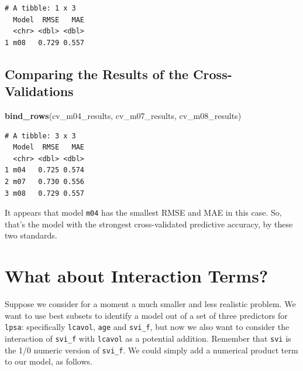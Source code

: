 \documentclass[]{book}
\newenvironment{Shaded}{\begin{snugshade}}{\end{snugshade}}
\newcommand{\KeywordTok}[1]{\textcolor[rgb]{0.13,0.29,0.53}{\textbf{#1}}}
\newcommand{\DataTypeTok}[1]{\textcolor[rgb]{0.13,0.29,0.53}{#1}}
\newcommand{\DecValTok}[1]{\textcolor[rgb]{0.00,0.00,0.81}{#1}}
\newcommand{\StringTok}[1]{\textcolor[rgb]{0.31,0.60,0.02}{#1}}
\newcommand{\OtherTok}[1]{\textcolor[rgb]{0.56,0.35,0.01}{#1}}
\newcommand{\OperatorTok}[1]{\textcolor[rgb]{0.81,0.36,0.00}{\textbf{#1}}}
\newcommand{\NormalTok}[1]{#1}
\theoremstyle{definition}
\theoremstyle{definition}
\theoremstyle{definition}
\theoremstyle{remark}
\begin{document}
\begin{verbatim}
# A tibble: 1 x 3
  Model  RMSE   MAE
  <chr> <dbl> <dbl>
1 m08   0.729 0.557
\end{verbatim}

\subsection{Comparing the Results of the
Cross-Validations}\label{comparing-the-results-of-the-cross-validations}

\begin{Shaded}
\begin{Highlighting}[]
\KeywordTok{bind_rows}\NormalTok{(cv_m04_results, cv_m07_results, cv_m08_results)}
\end{Highlighting}
\end{Shaded}

\begin{verbatim}
# A tibble: 3 x 3
  Model  RMSE   MAE
  <chr> <dbl> <dbl>
1 m04   0.725 0.574
2 m07   0.730 0.556
3 m08   0.729 0.557
\end{verbatim}

It appears that model \texttt{m04} has the smallest RMSE and MAE in this
case. So, that's the model with the strongest cross-validated predictive
accuracy, by these two standards.

\section{What about Interaction
Terms?}\label{what-about-interaction-terms}

Suppose we consider for a moment a much smaller and less realistic
problem. We want to use best subsets to identify a model out of a set of
three predictors for \texttt{lpsa}: specifically \texttt{lcavol},
\texttt{age} and \texttt{svi\_f}, but now we also want to consider the
interaction of \texttt{svi\_f} with \texttt{lcavol} as a potential
addition. Remember that \texttt{svi} is the 1/0 numeric version of
\texttt{svi\_f}. We could simply add a numerical product term to our
model, as follows.

\begin{Shaded}
\end{Shaded}
\end{document}
